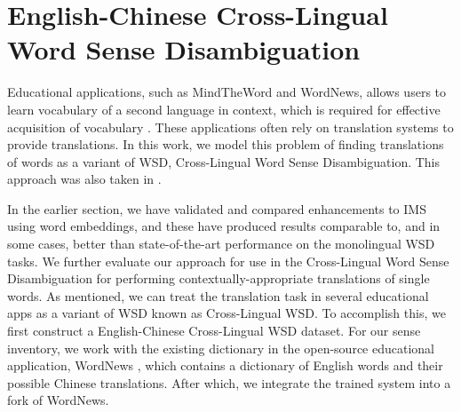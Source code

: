 \section{English-Chinese Cross-Lingual Word Sense Disambiguation}
\label{section:CLWSD}

Educational applications, such as MindTheWord and WordNews, allows users to learn vocabulary of a second language in context, which is required for effective acquisition of vocabulary \cite{Hirsch03readingcomprehension}. These applications often rely on translation systems to provide translations. In this work, we model this problem of finding translations of words as a variant of WSD, Cross-Lingual Word Sense Disambiguation. This approach was also taken in \cite{tao2014}.

In the earlier section, we have validated and compared enhancements to IMS using word embeddings, and these have produced results comparable to, and in some cases, better than state-of-the-art performance on the monolingual WSD tasks. We further evaluate our approach for use in the Cross-Lingual Word Sense Disambiguation for performing contextually-appropriate translations of single words. As mentioned, we can treat the translation task in several educational apps as a variant of WSD known as Cross-Lingual WSD. To accomplish this, we first construct a English-Chinese Cross-Lingual WSD dataset. For our sense inventory, we work with the existing dictionary in the open-source educational application, WordNews \cite{tao2014}, which contains a dictionary of English words and their possible Chinese translations. After which, we integrate the trained system into a fork of WordNews. 

